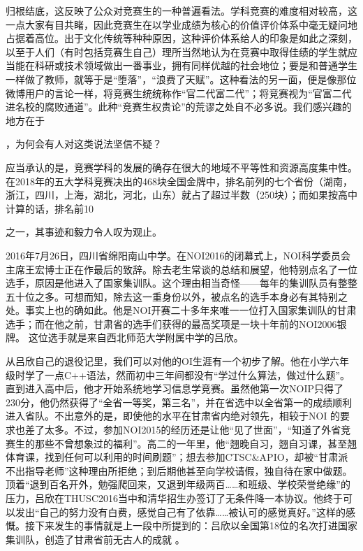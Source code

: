 \documentclass{article}
\begin{document}
归根结底，这反映了公众对竞赛⽣的⼀种普遍看法。学科竞赛的难度相对较⾼，这⼀点⼤家有⽬共睹，因此竞赛⽣在以学业成绩为核⼼的价值评价体系中毫⽆疑问地占据着⾼位。出于⽂化传统等种种原因，这种评价体系给⼈的印象是如此之深刻，以⾄于⼈们（有时包括竞赛⽣⾃⼰）理所当然地认为在竞赛中取得佳绩的学⽣就应当能在科研或技术领域做出⼀番事业，拥有同样优越的社会地位；要是和普通学⽣⼀样做了教师，就等于是“堕落”，“浪费了天赋”。这种看法的另⼀⾯，便是像那位微博⽤户的⾔论⼀样，将竞赛⽣统统称作“官⼆代富⼆代”；将竞赛视为“官富⼆代进名校的腐败通道”。此种“竞赛⽣权贵论”的荒谬之处⾃不必多说。我们感兴趣的地⽅在于
\newpage

，为何会有⼈对这类说法坚信不疑？ 

应当承认的是，竞赛学科的发展的确存在很⼤的地域不平等性和资源⾼度集中性。在2018年的五⼤学科竞赛决出的468块全国⾦牌中，排名前列的七个省份（湖南，浙江，四川，上海，湖北，河北，⼭东）就占了超过半数（250块）；⽽如果按⾼中计算的话，排名前10%

\newpage
之⼀，其事迹和毅⼒令⼈叹为观⽌。 

2016年7⽉26⽇，四川省绵阳南⼭中学。在NOI2016的闭幕式上，NOI科学委员会主席王宏博⼠正在作最后的致辞。除去⽼⽣常谈的总结和展望，他特别点名了⼀位选⼿，原因是他进⼊了国家集训队。这个理由相当奇怪——每年的集训队员有整整五⼗位之多。可想⽽知，除去这⼀重⾝份以外，被点名的选⼿本⾝必有其特别之处。事实上也的确如此。他是NOI开赛⼆⼗多年来唯⼀⼀位打⼊国家集训队的⽢肃选⼿；⽽在他之前，⽢肃省的选⼿们获得的最⾼奖项是⼀块⼗年前的NOI2006银牌。
这位选⼿就是来⾃西北师范⼤学附属中学的吕欣。 

从吕欣⾃⼰的退役记⾥，我们可以对他的OI⽣涯有⼀个初步了解。他在⼩学六年级时学了⼀点C++语法，然⽽初中三年间都没有“学过什么算法，做过什么题”。直到进⼊⾼中后，他才开始系统地学习信息学竞赛。虽然他第⼀次NOIP只得了230分，他仍然获得了“全省⼀等奖，第三名”，并在省选中以全省第⼀的成绩顺利进⼊省队。不出意外的是，即使他的⽔平在⽢肃省内绝对领先，相较于NOI
\newpage
的要求也差了太多。不过，参加NOI2015的经历还是让他“见了世⾯”，“知道了外省竞赛⽣的那些不曾想象过的福利”。⾼⼆的⼀年⾥，他“翘晚⾃习，翘⾃习课，甚⾄翘体育课，找到任何可以利⽤的时间刷题”；想去参加CTSC&APIO，却被“⽢肃派不出指导⽼师”这种理由所拒绝；到后期他甚⾄向学校请假，独⾃待在家中做题。顶着“退到百名开外，勉强爬回来，又退到年级两百……和班级、学校荣誉绝缘”的压⼒，吕欣在THUSC2016当中和清华招⽣办签订了⽆条件降⼀本协议。他终于可以发出“⾃⼰的努⼒没有⽩费，感觉⾃⼰有了依靠……被认可的感觉真好。”这样的感慨。接下来发⽣的事情就是上⼀段中所提到的：吕欣以全国第18位的名次打进国家集训队，创造了⽢肃省前⽆古⼈的成就
。 
\end{document}
